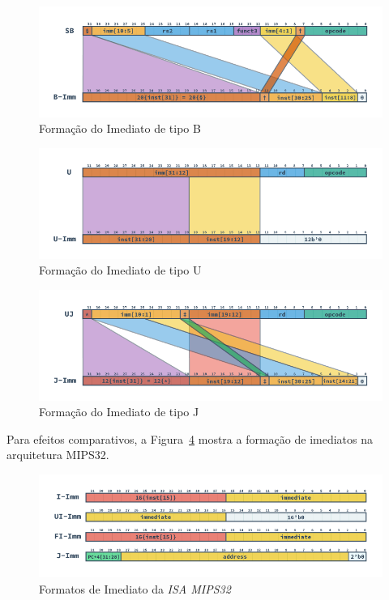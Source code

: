         \begin{figure}[H]
        \centering
            \includegraphics[width=1\linewidth]{../images/RV_B_Imm.png}
            \caption{Formação do Imediato de tipo B
                }\label{fig:riscv_b_imm}
        \end{figure}

        \begin{figure}[H]
        \centering
            \includegraphics[width=1\linewidth]{../images/RV_U_Imm.png}
            \caption{Formação do Imediato de tipo U
                }\label{fig:riscv_u_imm}
        \end{figure}

        \begin{figure}[H]
        \centering
            \includegraphics[width=1\linewidth]{../images/RV_J_Imm.png}
            \caption{Formação do Imediato de tipo J
                }\label{fig:riscv_j_imm}
        \end{figure}

        { Para efeitos comparativos, a Figura~\ref{fig:mips_immediates} mostra a
            formação de imediatos na arquitetura MIPS32.
        }

        \begin{figure}[H]
        \centering
            \includegraphics[width=1\linewidth]{../images/MIPS_Immediates.png}
            \caption{Formatos de Imediato da \textit{ISA MIPS32}}\label{fig:mips_immediates}
        \end{figure}


